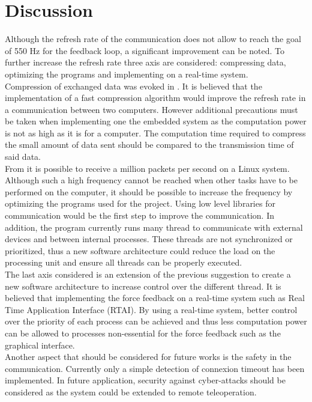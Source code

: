 \section{Discussion}

Although the refresh rate of the communication does not allow to reach the goal of 550 Hz for the feedback loop, a significant improvement can be noted.  To further increase the refresh rate three axis are considered: compressing data, optimizing the programs and implementing on a real-time system.\\
Compression of exchanged data was evoked in . It is believed that the implementation of a fast compression algorithm would improve the refresh rate in a communication between two computers. However additional precautions must be taken when implementing one the embedded system as the computation power is not as high as it is for a computer. The computation time required to compress the small amount of data sent should be compared to the transmission time of said data.\\
From \cite{million_packets} it is possible to receive a million packets per second on a Linux system. Although such a high frequency cannot be reached when other tasks have to be performed on the computer, it should be possible to increase the frequency by optimizing the programs used for the project. Using low level libraries for communication would be the first step to improve the communication. In addition, the program currently runs many thread to communicate with external devices and between internal processes. These threads are not synchronized or prioritized, thus a new software architecture could reduce the load on the processing unit and ensure all threads can be properly executed.\\
The last axis considered is an extension of the previous suggestion to create a new software architecture to increase control over the different thread. It is believed that implementing the force feedback on a real-time system such as Real Time Application Interface (RTAI). By using a real-time system, better control over the priority of each process can be achieved and thus less computation power can be allowed to processes non-essential for the force feedback such as the graphical interface.\\
Another aspect that should be considered for future works is the safety in the communication. Currently only a simple detection of connexion timeout has been implemented. In future application, security against cyber-attacks should be considered as the system could be extended to remote teleoperation.

